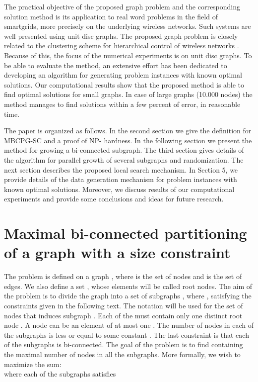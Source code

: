 The practical objective of the proposed graph problem and the corresponding solution method is its application to real word problems in the field of smartgrids, more precisely on the underlying wireless networks. Such systems are well presented using unit disc graphs. The proposed graph problem is closely related to the clustering scheme for hierarchical control of wireless networks \citep{banerjee2001clustering,chang2006cluster}. Because of this,  the focus of the numerical experiments is on unit disc graphs. To be able to evaluate the method, an extensive effort has been dedicated to developing an algorithm for generating problem instances with known optimal solutions. Our computational results  show that the proposed method is able to find optimal solutions for small graphs. In case of large graphs (10.000 nodes) the method manages to find solutions within a few percent of error, in reasonable time. 

The paper is organized as follows. In the second section we give the definition for MBCPG-SC and a proof of NP- hardness. In the following section we present the method for growing a bi-connected subgraph. The third section gives  details of the algorithm for parallel growth of several subgraphs and randomization. The next section describes the proposed local search mechanism. In Section 5, we provide details of the data generation mechanism for problem instances with known optimal solutions. Moreover, we discuss results of our computational experiments and provide some conclusions and ideas for future research.




\section{Maximal bi-connected partitioning of a graph with a size constraint}
The problem is defined on a graph , where  is the set of nodes and  is the set of edges. We also define a set , whose elements  will be called root nodes. The aim of the problem is to divide the graph  into a set of subgraphs , where  , satisfying the  constraints given in the following text. The notation  will be used for the set of nodes that induces subgraph .  Each of the  must contain only one distinct root node . A node  can be an element of at most one . The number of nodes in each of the subgraphs  is less or equal to some constant . The last constraint is that each of the subgraphs  is bi-connected. The goal of the problem is to find  containing the maximal number of nodes in all the subgraphs.  More formally, we wish to maximize the  sum:
\\
where each of the subgraphs  satisfies 

